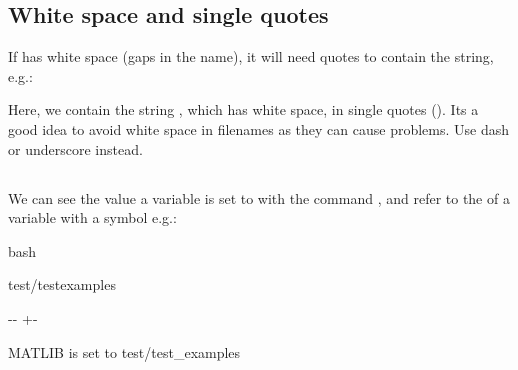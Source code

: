 \documentclass[letterpaper,10pt,english]{sphinxmanual}
\newlength\nbsphinxcodecellspacing
\begin{document}
\subsection{White space and single quotes \sphinxstyleliteralintitle{\sphinxupquote{\textquotesingle{}}}}
\label{\detokenize{Appendix1:White-space-and-single-quotes-'}}
If  has white space (gaps in the name), it will need quotes to contain the string, e.g.:

\begin{sphinxVerbatim}[commandchars=\\\{\}]
 
\end{sphinxVerbatim}

Here, we contain the string , which has white space, in single quotes (\sphinxcode{\sphinxupquote{\textquotesingle{}}}). Its a good idea to avoid white space in filenames as they can cause problems. Use dash \sphinxcode{\sphinxupquote{\sphinxhyphen{}}} or underscore \sphinxcode{\sphinxupquote{\_}} instead.


\subsection{}
\label{\detokenize{Appendix1:echo}}
We can see the value a variable is set to with the command , and refer to the  of a variable with a \sphinxcode{\sphinxupquote{\$}} symbol e.g.:

{
\begin{sphinxVerbatim}[commandchars=\\\{\}]
\llap{\color{nbsphinxin}[1]:\,\hspace{\fboxrule}\hspace{\fboxsep}}\PYGZpc{}\PYGZpc{}bash

 test/test\PYGZus{}examples
 
\end{sphinxVerbatim}
}

{

\kern-\sphinxverbatimsmallskipamount\kern-\baselineskip
\kern+\FrameHeightAdjust\kern-\fboxrule
\vspace{\nbsphinxcodecellspacing}

\begin{sphinxVerbatim}[commandchars=\\\{\}]
MATLIB is set to test/test\_examples
\end{sphinxVerbatim}
}
\end{document}

